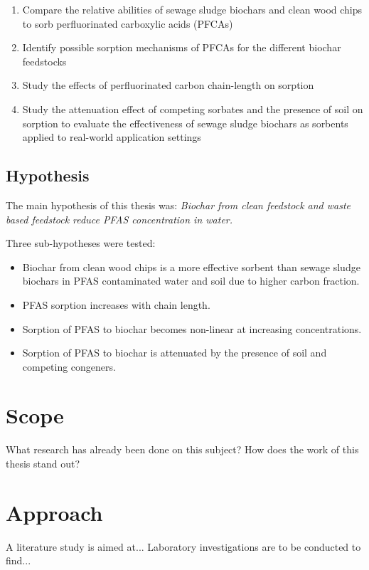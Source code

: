 \begin{enumerate}
    \item{Compare the relative abilities of sewage sludge biochars and clean wood chips to sorb perfluorinated carboxylic acids (PFCAs)}
    \item{Identify possible sorption mechanisms of PFCAs for the different biochar feedstocks}
    \item{Study the effects of perfluorinated carbon chain-length on sorption }
    \item{Study the attenuation effect of competing sorbates and the presence of soil on sorption to evaluate the effectiveness of sewage sludge biochars as sorbents applied to real-world application settings}
\end{enumerate}

\subsection{Hypothesis}
The main hypothesis of this thesis was:
\textit{Biochar from clean feedstock and waste based feedstock reduce PFAS concentration in water.}

Three sub-hypotheses were tested:
\begin{itemize}
    \item Biochar from clean wood chips is a more effective sorbent than sewage sludge biochars in PFAS contaminated water and soil due to higher carbon fraction.
    \item PFAS sorption increases with chain length.
    \item Sorption of PFAS to biochar becomes non-linear at increasing concentrations.
    \item Sorption of PFAS to biochar is attenuated by the presence of soil and competing congeners. 
\end{itemize}
\section{Scope} 
What research has already been done on this subject? How does the work of this thesis stand out?
\section{Approach}
A literature study is aimed at...
Laboratory investigations are to be conducted to find... 
